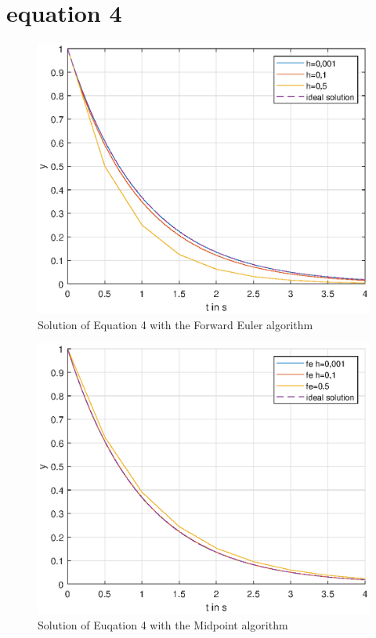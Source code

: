 \section{equation 4}
\begin{figure}[H]
    \centering
    \includegraphics[width=\plotwidth]{plots/fe_only_equation_4.eps}
    \caption{Solution of Equation 4 with the Forward Euler algorithm}
    \label{fig:eq4_fe_only}
\end{figure}

\begin{figure}[H]
    \centering
    \includegraphics[width=\plotwidth]{plots/rk_only_equation_4.eps}
    \caption{Solution of Euqation 4 with the Midpoint algorithm}
    \label{fig:eq4_rk_only}
\end{figure}

